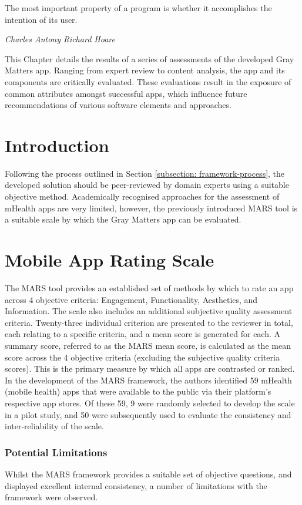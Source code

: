  \label{chapter: prevention-evaluation}

\epigraph{The most important property of a program is whether it accomplishes the intention of its user.}{\textit{Charles Antony Richard Hoare}}

This Chapter details the results of a series of assessments of the developed Gray Matters app. Ranging from expert review to content analysis, the app and its components are critically evaluated. These evaluations result in the exposure of common attributes amongst successful apps, which influence future recommendations of various software elements and approaches.

\section{Introduction}
Following the process outlined in Section \ref{subsection: framework-process}, the developed solution should be peer-reviewed by domain experts using a suitable objective method. Academically recognised approaches for the assessment of mHealth apps are very limited, however, the previously introduced MARS \cite{Stoyanov2015} tool is a suitable scale by which the Gray Matters app can be evaluated.

\section{Mobile App Rating Scale}
The MARS tool provides an established set of methods by which to rate an app across 4 objective criteria: Engagement, Functionality, Aesthetics, and Information. The scale also includes an additional subjective quality assessment criteria. Twenty-three individual criterion are presented to the reviewer in total, each relating to a specific criteria, and a mean score is generated for each. A summary score, referred to as the MARS mean score, is calculated as the mean score across the 4 objective criteria (excluding the subjective quality criteria scores). This is the primary measure by which all apps are contrasted or ranked.
In the development of the MARS framework, the authors identified 59 mHealth (mobile health) apps that were available to the public via their platform's respective app stores. Of these 59, 9 were randomly selected to develop the scale in a pilot study, and 50 were subsequently used to evaluate the consistency and inter-reliability of the scale.

\subsubsection{Potential Limitations}
Whilst the MARS framework provides a suitable set of objective questions, and displayed excellent internal consistency, a number of limitations with the framework were observed.

